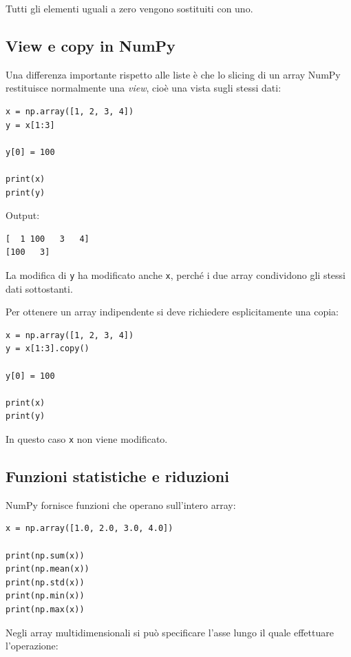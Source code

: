 \documentclass[11pt,a4paper]{book}
\begin{document}
Tutti gli elementi uguali a zero vengono sostituiti con uno.

\subsection{View e copy in NumPy}

Una differenza importante rispetto alle liste è che lo slicing di un array NumPy restituisce normalmente una \emph{view}, cioè una vista sugli stessi dati:

\begin{lstlisting}[style=python]
x = np.array([1, 2, 3, 4])
y = x[1:3]

y[0] = 100

print(x)
print(y)
\end{lstlisting}

Output:

\begin{lstlisting}[style=python, numbers=none]
[  1 100   3   4]
[100   3]
\end{lstlisting}

La modifica di \texttt{y} ha modificato anche \texttt{x}, perché i due array condividono gli stessi dati sottostanti.

Per ottenere un array indipendente si deve richiedere esplicitamente una copia:

\begin{lstlisting}[style=python]
x = np.array([1, 2, 3, 4])
y = x[1:3].copy()

y[0] = 100

print(x)
print(y)
\end{lstlisting}

In questo caso \texttt{x} non viene modificato.

\subsection{Funzioni statistiche e riduzioni}

NumPy fornisce funzioni che operano sull'intero array:

\begin{lstlisting}[style=python]
x = np.array([1.0, 2.0, 3.0, 4.0])

print(np.sum(x))
print(np.mean(x))
print(np.std(x))
print(np.min(x))
print(np.max(x))
\end{lstlisting}

Negli array multidimensionali si può specificare l'asse lungo il quale effettuare l'operazione:
\end{document}
